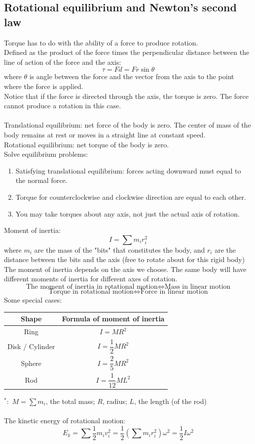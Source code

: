 \subsection{Rotational equilibrium and Newton's second law}
Torque has to do with the ability of a force to produce rotation.\\
Defined as the product of the force times the perpendicular distance between the line of action of the force and the axis:
\[\tau =Fd=Fr\sin\theta\]
where $\theta$ is angle between the force and the vector from the axis to the point where the force is applied.\\
Notice that if the force is directed through the axis, the torque is zero. The force cannot produce a rotation in this case.\\\\
Translational equilibrium: net force of the body is zero. The center of mass of the body remains at rest or moves in a straight line at constant speed.\\
Rotational equilibrium: net torque of the body is zero.\\
Solve equilibrium problems:
\begin{enumerate}
  \item Satisfying translational equilibrium: forces acting downward must equal to the normal force.
  \item Torque for counterclockwise and clockwise direction are equal to each other. 
  \item You may take torques about any axis, not just the actual axis of rotation.
\end{enumerate}
Moment of inertia:
\[I=\sum m_ir_i^2\]
where $m_i$ are the mass of the "bits" that constitutes the body, and $r_i$ are the distance between the bits and the axis (free to rotate about for this rigid body)\\
The moment of inertia depends on the axis we choose. The same body will have different moments of inertia for different axes of rotation.
\[\text{The moment of inertia in rotational motion}\Leftrightarrow\text{Mass in linear motion}\]
\[\text{Torque in rotational motion}\Leftrightarrow\text{Force in linear motion}\]
Some special cases:
\begin{center}
  \begin{tabular}{|c|c|}\hline
    Shape & Formula of moment of inertia \\\hline
    Ring & $I=MR^2$ \\\hline
    Disk / Cylinder & $I=\dfrac{1}{2}MR^2$ \\\hline
    Sphere & $I=\dfrac{2}{5}MR^2$ \\\hline
    Rod & $I=\dfrac{1}{12}ML^2$ \\\hline 
  \end{tabular}
\end{center}
$^*:$ $M=\displaystyle \sum m_i$, the total mass; $R$, radius; $L$, the length (of the rod)\\\\
The kinetic energy of rotational motion:
\[E_k=\sum \dfrac{1}{2}m_iv_i^2=\dfrac{1}{2}\left(\sum m_ir_i^2\right)\omega^2=\dfrac{1}{2}I\omega^2\]

